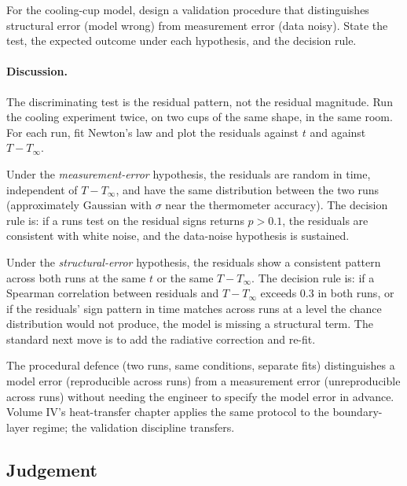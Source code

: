 \begin{exercise}
For the cooling-cup model, design a validation procedure that
distinguishes structural error (model wrong) from measurement
error (data noisy). State the test, the expected outcome under
each hypothesis, and the decision rule.

\paragraph{Discussion.} The discriminating test is the residual
pattern, not the residual magnitude. Run the cooling experiment
twice, on two cups of the same shape, in the same room. For each
run, fit Newton's law and plot the residuals against $t$ and
against $T - T_{\infty}$.

Under the \textit{measurement-error} hypothesis, the residuals are
random in time, independent of $T - T_{\infty}$, and have the same
distribution between the two runs (approximately Gaussian with
$\sigma$ near the thermometer accuracy). The decision rule is: if
a runs test on the residual signs returns $p > 0.1$, the residuals
are consistent with white noise, and the data-noise hypothesis is
sustained.

Under the \textit{structural-error} hypothesis, the residuals show
a consistent pattern across both runs at the same $t$ or the same
$T - T_{\infty}$. The decision rule is: if a Spearman correlation
between residuals and $T - T_{\infty}$ exceeds $0.3$ in both runs,
or if the residuals' sign pattern in time matches across runs at a
level the chance distribution would not produce, the model is
missing a structural term. The standard next move is to add the
radiative correction and re-fit.

The procedural defence (two runs, same conditions, separate fits)
distinguishes a model error (reproducible across runs) from a
measurement error (unreproducible across runs) without needing
the engineer to specify the model error in advance. Volume IV's
heat-transfer chapter applies the same protocol to the
boundary-layer regime; the validation discipline transfers.
\end{exercise}

\subsection*{Judgement}

